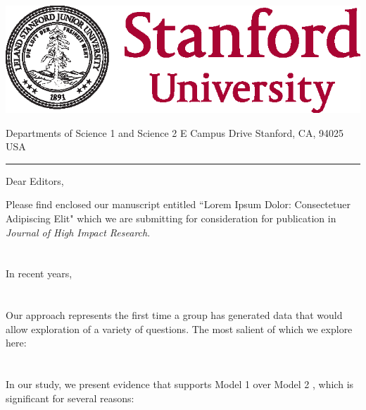 \documentclass[11pt]{article}
\newcommand{\journalname}{Journal of High Impact Research} %
\newcommand{\mybullet}{\textbullet\hspace{0.5em}}
\begin{document}
\noindent
\begin{minipage}[t]{0.35\textwidth}
\vspace{0pt} %
\includegraphics[width=\linewidth]{stanford_logos/SUSig_Seal_Stacked_Left.eps} %
\end{minipage}
\hfill
\begin{minipage}[t]{0.6\textwidth}
\vspace{0pt} %
{\color{gray}\LARGE Departments of Science 1 and Science 2\color{black}\small{} E Campus Drive \mybullet Stanford, CA, 94025 \mybullet USA}
\end{minipage}

\vspace{1em} %
\noindent\rule{\linewidth}{1pt} %
\bigskip

\noindent Dear Editors,

\noindent Please find enclosed our manuscript entitled ``Lorem Ipsum Dolor: Consectetuer Adipiscing Elit" which we are submitting for consideration for publication in \textit{\journalname}.

\section{}
\noindent In recent years, \lipsum[1] 

\section{}
\noindent Our approach represents the first time a group has generated data that would allow exploration of a variety of questions. The most salient of which we explore here: 

\section{}
In our study, we present evidence that supports Model 1 \citep{zany2023quantum} over Model 2 \citep{wacky2023spaghetti}, which is significant for several reasons:
\end{document}
